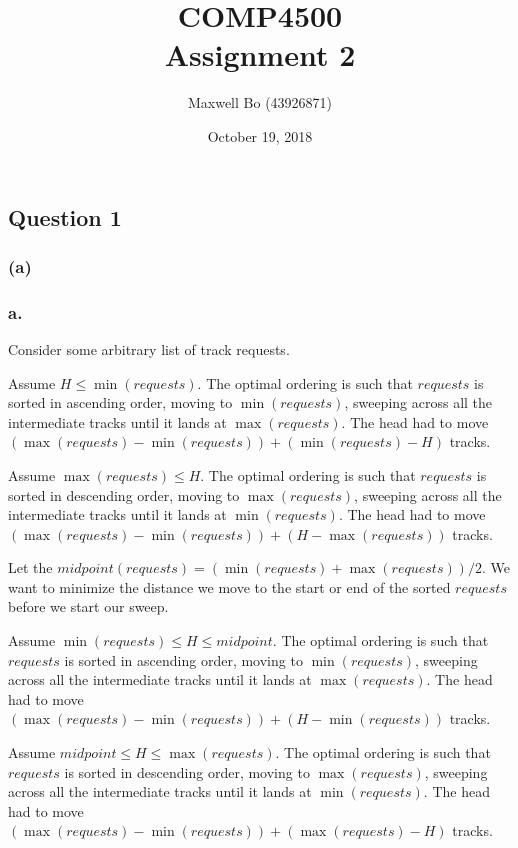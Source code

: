\documentclass[11pt,a4paper]{article}
\begin{document}
\title{COMP4500 \\ Assignment 2}
\author{Maxwell Bo (43926871)}
\date{October 19, 2018}
\maketitle

\subsection*{Question 1}
\subsubsection*{(a)}



\subsubsection*{a.}

Consider some arbitrary list of track requests. 

Assume $H \leqslant \min(requests)$. The optimal ordering is such that $requests$ is sorted in ascending order, moving to $\min(requests)$, sweeping across all the intermediate tracks until it lands at $\max(requests)$. The head had to move $(\max(requests) - \min(requests)) + (\min(requests) - H)$ tracks.

Assume $\max(requests) \leqslant H$. The optimal ordering is such that $requests$ is sorted in descending order, moving to $\max(requests)$, sweeping across all the intermediate tracks until it lands at $\min(requests)$. The head had to move $(\max(requests) - \min(requests)) + (H - \max(requests))$ tracks.

Let the $midpoint(requests) = (\min(requests) + \max(requests)) / 2$. We want to minimize the distance we move to the start or end of the sorted $requests$ before we start our sweep.

Assume $\min(requests) \leqslant H \leqslant midpoint$. The optimal ordering is such that $requests$ is sorted in ascending order, moving to $\min(requests)$, sweeping across all the intermediate tracks until it lands at $\max(requests)$. The head had to move $(\max(requests) - \min(requests)) + (H - \min(requests))$ tracks.

Assume $midpoint \leqslant H \leqslant \max(requests)$. The optimal ordering is such that $requests$ is sorted in descending order, moving to $\max(requests)$, sweeping across all the intermediate tracks until it lands at $\min(requests)$. The head had to move $(\max(requests) - \min(requests)) + (\max(requests)- H)$ tracks.
\end{document}
